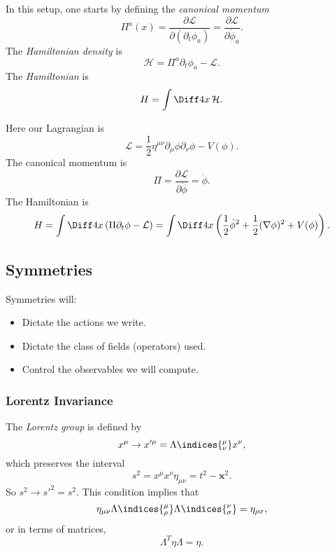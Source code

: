 \documentclass[12pt]{article}
\begin{document}
In this setup, one starts by defining the \emph{canonical momentum}
\[
\Pi^a(x) = \frac{\partial \mathcal{L}}{\partial(\partial_t \phi_a)} = \frac{\partial \mathcal{L}}{\partial \dot \phi_a}.
\]
The \emph{Hamiltonian density} is
\[
\mathcal{H} = \Pi^a \partial_t \phi_a - \mathcal{L}.
\]
The \emph{Hamiltonian} is
\[
H = \int \Diff4 x \, \mathcal{H}.
\]

\begin{exbox}
	Here our Lagrangian is
	\[
	\mathcal{L} = \frac{1}{2} \eta^{\mu \nu} \partial_\mu \phi \partial_\nu \phi - V(\phi).
	\]
	The canonical momentum is
	\[
	\Pi = \frac{\partial \mathcal{L}}{\partial \dot \phi} = \dot \phi.
	\]
	The Hamiltonian is
	\[
	H = \int \Diff4 x \, (\Pi \partial_t \phi - \mathcal{L}) = \int \Diff4 x \left( \frac{1}{2} \dot \phi^2 + \frac{1}{2} (\nabla \phi)^2  + V(\phi) \right).
	\]
\end{exbox}

\subsection{Symmetries}%
\label{sub:sym}

Symmetries will:
\begin{itemize}
	\item Dictate the actions we write.
	\item Dictate the class of fields (operators) used.
	\item Control the observables we will compute.
\end{itemize}

\subsubsection{Lorentz Invariance}%
\label{subsub:lorentz}

The \emph{Lorentz group} is defined by
\[
x^\mu \to x'^\mu = \Lambda\indices{^{\mu}_{\nu}} x^\nu,
\]
which preserves the interval
\[
s^2 = x^\mu x^\nu \eta_{\mu\nu} = t^2 - \mathbf{x}^2.
\]
So $s^2 \to s'^2 = s^2$. This condition implies that
\[
\eta_{\mu\nu} \Lambda\indices{^{\mu}_{\rho}} \Lambda\indices{^{\nu}_{\sigma}} = \eta_{\rho\sigma},
\]
or in terms of matrices,
\[
\Lambda^T \eta \Lambda = \eta.
\]
\end{document}
